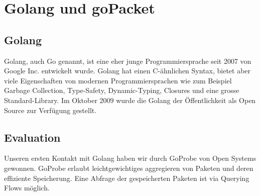 \section{Golang und goPacket}
\label{sec:Golang und goPacket}

\subsection{Golang}
Golang, auch Go genannt, ist eine eher junge Programmiersprache seit 2007 von Google Inc. entwickelt wurde. Golang hat einen C-ähnlichen Syntax, bietet aber viele Eigenschaften von modernen Programmiersprachen wie zum Beispiel Garbage Collection, Type-Safety, Dynamic-Typing, Closures und eine grosse Standard-Library.
Im Oktober 2009 wurde die Golang der Öffentlichkeit als Open Source zur Verfügung gestellt.

\subsection{Evaluation}
Unseren ersten Kontakt mit Golang haben wir durch GoProbe von Open Systems gewonnen.
GoProbe erlaubt leichtgewichtiges aggregieren von Paketen und deren effiziente Speicherung. Eine Abfrage der gespeicherten Paketen ist via Querying Flows möglich.
